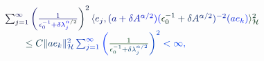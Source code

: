 \documentclass[12pt]{article}
\begin{document}
\makeatletter
\renewcommand*{\@textcolor}[3]{%
  \protect\leavevmode
  \begingroup
    \color#1{#2}#3%
  \endgroup
}
\makeatother
\begin{displaymath}
\begin{array} {rl} & { { } \mathcolor[RGB]{0,0,15}{\sum} _ { \mathcolor[RGB]{0,0,30}{j} \mathcolor[RGB]{0,0,45}{=} \mathcolor[RGB]{0,0,60}{1} } ^ { \mathcolor[RGB]{0,0,75}{\infty} } \mathcolor[RGB]{0,0,90}{\left(} \mathcolor[RGB]{0,0,105}{\frac { \mathcolor[RGB]{0,0,120}{1} } { \mathcolor[RGB]{0,0,135}{\epsilon} _ { \mathcolor[RGB]{0,0,150}{0} } ^ { \mathcolor[RGB]{0,0,165}{-} \mathcolor[RGB]{0,0,180}{1} } \mathcolor[RGB]{0,0,195}{+} \mathcolor[RGB]{0,0,210}{\delta} \mathcolor[RGB]{0,0,225}{\lambda} _ { \mathcolor[RGB]{0,0,240}{j} } ^ { \mathcolor[RGB]{0,0,255}{\alpha} \mathcolor[RGB]{0,15,0}{/} \mathcolor[RGB]{0,15,15}{2} } } } \mathcolor[RGB]{0,15,30}{\right)} ^ { \mathcolor[RGB]{0,15,45}{2} } \mathcolor[RGB]{0,15,60}{\langle} \mathcolor[RGB]{0,15,75}{e} _ { \mathcolor[RGB]{0,15,90}{j} } \mathcolor[RGB]{0,15,105}{,} \mathcolor[RGB]{0,15,120}{(} \mathcolor[RGB]{0,15,135}{a} \mathcolor[RGB]{0,15,150}{+} \mathcolor[RGB]{0,15,165}{\delta} \mathcolor[RGB]{0,15,180}{A} ^ { \mathcolor[RGB]{0,15,195}{\alpha} \mathcolor[RGB]{0,15,210}{/} \mathcolor[RGB]{0,15,225}{2} } \mathcolor[RGB]{0,15,240}{)} \mathcolor[RGB]{0,15,255}{(} \mathcolor[RGB]{0,30,0}{\epsilon} _ { \mathcolor[RGB]{0,30,15}{0} } ^ { \mathcolor[RGB]{0,30,30}{-} \mathcolor[RGB]{0,30,45}{1} } \mathcolor[RGB]{0,30,60}{+} \mathcolor[RGB]{0,30,75}{\delta} \mathcolor[RGB]{0,30,90}{A} ^ { \mathcolor[RGB]{0,30,105}{\alpha} \mathcolor[RGB]{0,30,120}{/} \mathcolor[RGB]{0,30,135}{2} } \mathcolor[RGB]{0,30,150}{)} ^ { \mathcolor[RGB]{0,30,165}{-} \mathcolor[RGB]{0,30,180}{2} } \mathcolor[RGB]{0,30,195}{(} \mathcolor[RGB]{0,30,210}{a} \mathcolor[RGB]{0,30,225}{e} _ { \mathcolor[RGB]{0,30,240}{k} } \mathcolor[RGB]{0,30,255}{)} \mathcolor[RGB]{0,45,0}{\rangle} _ { \mathcal { \mathcolor[RGB]{0,45,15}{H} } } ^ { \mathcolor[RGB]{0,45,30}{2} } } \\ & { { } \qquad \mathcolor[RGB]{0,45,45}{\leq} \mathcolor[RGB]{0,45,60}{C} \mathcolor[RGB]{0,45,75}{\|} \mathcolor[RGB]{0,45,90}{a} \mathcolor[RGB]{0,45,105}{e} _ { \mathcolor[RGB]{0,45,120}{k} } \mathcolor[RGB]{0,45,135}{\|} _ { \mathcal { \mathcolor[RGB]{0,45,150}{H} } } ^ { \mathcolor[RGB]{0,45,165}{2} } \mathcolor[RGB]{0,45,180}{\sum} _ { \mathcolor[RGB]{0,45,195}{j} \mathcolor[RGB]{0,45,210}{=} \mathcolor[RGB]{0,45,225}{1} } ^ { \mathcolor[RGB]{0,45,240}{\infty} } \mathcolor[RGB]{0,45,255}{\left(} \mathcolor[RGB]{0,60,0}{\frac { \mathcolor[RGB]{0,60,15}{1} } { \mathcolor[RGB]{0,60,30}{\epsilon} _ { \mathcolor[RGB]{0,60,45}{0} } ^ { \mathcolor[RGB]{0,60,60}{-} \mathcolor[RGB]{0,60,75}{1} } \mathcolor[RGB]{0,60,90}{+} \mathcolor[RGB]{0,60,105}{\delta} \mathcolor[RGB]{0,60,120}{\lambda} _ { \mathcolor[RGB]{0,60,135}{j} } ^ { \mathcolor[RGB]{0,60,150}{\alpha} \mathcolor[RGB]{0,60,165}{/} \mathcolor[RGB]{0,60,180}{2} } } } \mathcolor[RGB]{0,60,195}{\right)} ^ { \mathcolor[RGB]{0,60,210}{2} } \mathcolor[RGB]{0,60,225}{<} \mathcolor[RGB]{0,60,240}{\infty} \mathcolor[RGB]{0,60,255}{,} } \end{array}
\end{displaymath}
\end{document}
